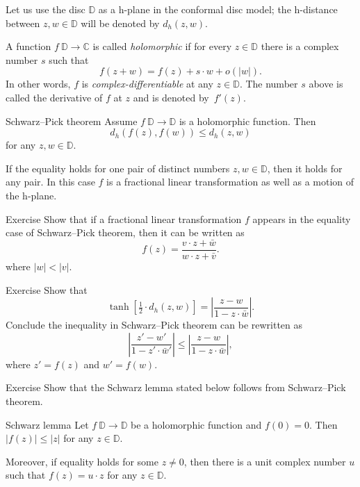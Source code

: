 Let us use the disc $\mathbb{D}$ as a h-plane in the conformal disc model;
the h-distance between $z, w\in\mathbb{D}$ will be denoted by $d_h(z,w)$.

A function $f\:\mathbb{D}\to \mathbb{C}$ is called \emph{holomorphic} if for every $z\in \mathbb{D}$
there is a complex number $s$ such that
\[f(z+w)=f(z)+s\cdot w+o(|w|).\]
In other words, $f$ is {}\emph{complex-differentiable}
at any $z\in\mathbb{D}$.
The number $s$ above is called the derivative of $f$ at $z$ and is denoted by~$f'(z)$.

\begin{thm}{Schwarz--Pick theorem}
Assume $f\: \mathbb{D}\to \mathbb{D}$ is a holomorphic function.
Then 
\[d_h(f(z),f(w))\le d_h(z,w)\]
for any $z,w\in \mathbb{D}$.

If the equality holds for one pair of distinct numbers $z,w\in \mathbb{D}$, then it holds for any pair. 
In this case $f$ is a fractional linear transformation as well as a motion of the h-plane.
\end{thm}

\begin{thm}{Exercise}\label{ex:schwarz-moebius}
Show that if a fractional linear transformation $f$ appears in the equality case of Schwarz--Pick theorem, then it can be written as 
\[f(z)=\frac{v\cdot z+\bar w}{w\cdot z+\bar v}.\]
where $|w|<|v|$.
\end{thm}


\begin{thm}{Exercise}\label{ex:schwarz-tanh}
Show that 
\[\tanh [\tfrac12\cdot d_h(z,w)]=\left|\frac{z-w}{1-z\cdot\bar w}\right|.\]
Conclude the inequality in Schwarz--Pick theorem can be rewritten as
\[\left|\frac{z'-w'}{1-z'\cdot\bar w'}\right|\le\left|\frac{z-w}{1-z\cdot\bar w}\right|,\]
where
$z'=f(z)$ and $w'=f(w)$.
\end{thm}


\begin{thm}{Exercise}\label{ex:schwarz}
Show that the Schwarz lemma stated below 
follows from Schwarz--Pick theorem.
\end{thm}

\begin{thm}{Schwarz lemma}
Let $f\: \mathbb{D}\to \mathbb{D}$ be a holomorphic function
and $f(0)=0$.
Then 
$|f(z)|\le |z|$
for any $z\in \mathbb{D}$.

Moreover, if equality holds for some $z\ne 0$, then there is a unit complex number $u$ 
such that 
$f(z)=u\cdot z$
for any $z\in\mathbb{D}$.
\end{thm}






